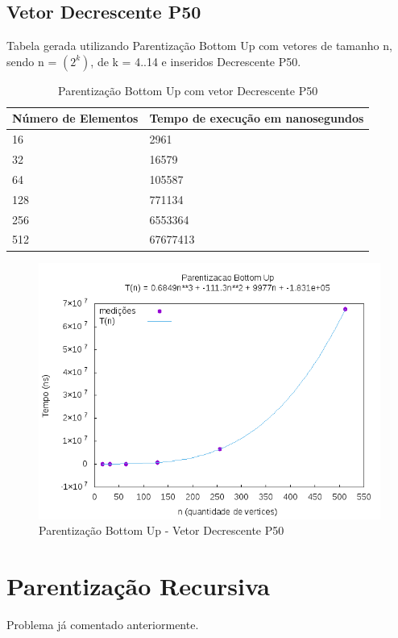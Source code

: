 \documentclass[12pt,a4paper,twoside]{report}
\begin{document}
\subsection{Vetor Decrescente P50}
Tabela gerada utilizando Parentização Bottom Up com vetores de tamanho n, sendo n = $(2^k)$, de k = 4..14 e inseridos Decrescente P50.
\begin{table}[H]
\centering
\caption{Parentização Bottom Up com vetor Decrescente P50}
\label{my-label}
\begin{tabular}{|l|l|}
\hline
\multicolumn{1}{|c|}{\textbf{Número de Elementos}} & \multicolumn{1}{c|}{\textbf{Tempo de execução em nanosegundos}} \\ \hline
16 & 2961 \\ \hline
32 & 16579 \\ \hline
64 & 105587 \\ \hline
128 & 771134 \\ \hline
256 & 6553364 \\ \hline
512 & 67677413 \\ \hline
\end{tabular}
\end{table}

\begin{figure}[H]
    \centering
    \includegraphics[width=0.7\linewidth]{graficos/Parentizacao BottomUp/Decrescente P50/ParentizacaoBottomUp.png}
  \caption{Parentização Bottom Up - Vetor Decrescente P50}
\end{figure}

\section{Parentização Recursiva}

Problema já comentado anteriormente.
\end{document}
